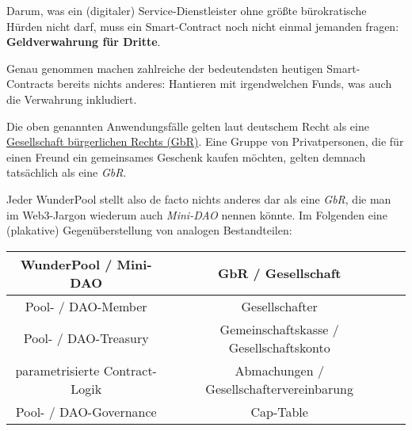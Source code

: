 \vspace{0.3cm}


\begin{Solution}

Darum, was ein (digitaler) Service-Dienstleister ohne größte bürokratische Hürden nicht darf, muss ein Smart-Contract noch nicht einmal jemanden fragen: \textbf{Geldverwahrung für Dritte}.

\vspace{0.2cm}

Genau genommen machen zahlreiche der bedeutendsten heutigen Smart-Contracts bereits nichts anderes: Hantieren mit irgendwelchen Funds, was auch die Verwahrung inkludiert. 

\end{Solution}

\vspace{0.3cm}



\begin{Konzept}

Die oben genannten Anwendungsfälle gelten laut deutschem Recht als eine \href{https://de.wikipedia.org/wiki/Gesellschaft_b%C3%BCrgerlichen_Rechts_(Deutschland)}{Gesellschaft bürgerlichen Rechts (GbR)}. Eine Gruppe von Privatpersonen, die für einen Freund ein gemeinsames Geschenk kaufen möchten, gelten demnach tatsächlich als eine \textit{GbR}.

\vspace{0.3cm}

Jeder WunderPool stellt also de facto nichts anderes dar als eine \textit{GbR}, die man im Web3-Jargon wiederum auch \textit{Mini-DAO} nennen könnte. Im Folgenden eine (plakative) Gegenüberstellung von analogen Bestandteilen: 

\vspace{0.5cm}

\begin{tabular}[h]{|c|c|c}
\hline
\textbf{WunderPool / Mini-DAO} & \textbf{GbR / Gesellschaft} \\
\hline
Pool- / DAO-Member & Gesellschafter \\
\hline
Pool- / DAO-Treasury & Gemeinschaftskasse / Gesellschaftskonto \\
\hline
parametrisierte Contract-Logik & Abmachungen / Gesellschaftervereinbarung \\
\hline
Pool- / DAO-Governance & Cap-Table \\
\hline
\end{tabular}

\end{Konzept}

